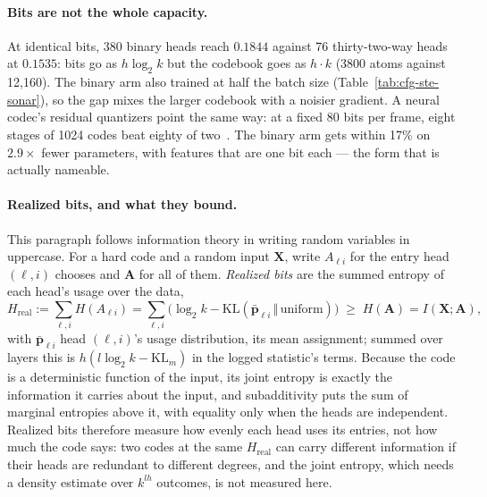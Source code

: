 \paragraph{Bits are not the whole capacity.} At identical bits, 380
binary heads reach $0.1844$ against 76 thirty-two-way heads at $0.1535$:
bits go as $h\log_2 k$ but the codebook goes as $h\cdot k$ (3800 atoms
against 12{,}160). The binary arm also trained at half the batch size
(Table~\ref{tab:cfg-ste-sonar}), so the gap mixes the larger codebook with
a noisier gradient. A neural codec's residual quantizers point the same
way: at a fixed 80 bits per frame, eight stages of 1024 codes beat eighty
of two~\cite{zeghidour2021}. The binary arm gets within 17\% on $2.9\times$ fewer
parameters, with features that are one bit each --- the form that is
actually nameable.

\paragraph{Realized bits, and what they bound.} This paragraph follows
information theory in writing random variables in uppercase. For a hard
code and a random input $\mathbf{X}$, write $A_{\ell i}$ for the entry
head $(\ell,i)$ chooses and $\mathbf{A}$ for all of them. \emph{Realized
bits} are the summed entropy of each head's usage over the data,
\begin{equation}
	H_{\mathrm{real}} := \sum_{\ell,i} H(A_{\ell i})
	= \sum_{\ell,i} \big(\log_2 k - \mathrm{KL}(\bar{\mathbf{p}}_{\ell i} \,\Vert\, \mathrm{uniform})\big)
	\;\geq\; H(\mathbf{A}) = I(\mathbf{X}; \mathbf{A}),
	\label{eq:realized}
\end{equation}
with $\bar{\mathbf{p}}_{\ell i}$ head $(\ell,i)$'s usage distribution, its
mean assignment; summed over layers this is $h(l\log_2 k - \mathrm{KL}_m)$
in the logged statistic's terms. Because
the code is a deterministic function of the input, its joint entropy is
exactly the information it carries about the input, and subadditivity
puts the sum of marginal entropies above it, with equality only when the
heads are independent. Realized bits therefore measure how evenly each
head uses its entries, not how much the code says: two codes at the same
$H_{\mathrm{real}}$ can carry different information if their heads are redundant to
different degrees, and the joint entropy, which needs a density estimate
over $k^{lh}$ outcomes, is not measured here.

